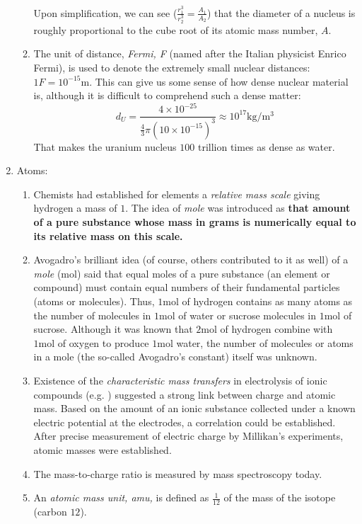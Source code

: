 \documentclass[12pt,a4paper]{book}
\begin{document}
\begin{enumerate}
\begin{enumerate}
                Upon simplification, we can see ($\frac{r_1^3}{r_2^3}=\frac{A_1}{A_2}$) that the diameter of a nucleus is roughly proportional to the cube root of its atomic mass number, $A$.
            \item \label{item: density-of-nucleus} The unit of distance, \emph{Fermi, F} (named after the Italian physicist Enrico Fermi), is used to denote the extremely small nuclear distances: $1 F = 10^{-15}\si{\m}$. This can give us some sense of how dense nuclear material is, although it is difficult to comprehend such a dense matter:
                $$
                    d_U = \frac{4\times 10^{-25}}{\frac{4}{3}\pi (10\times 10^{-15})^3} \approx 10^{17}\si{\kg\per\cubic\metre} 
                $$
                That makes the uranium nucleus $100$ trillion times as dense as water.
        \end{enumerate}
    \item Atoms:
        \begin{enumerate}
            \item Chemists had established for elements a \emph{relative mass scale} giving hydrogen a mass of $1$. The idea of \emph{mole} was introduced as \textbf{that amount of a pure substance whose mass in grams is numerically equal to its relative mass on this scale.}
            \item Avogadro's brilliant idea (of course, others contributed to it as well) of a \emph{mole} (\si{\mol}) said that equal moles of a pure substance (an element or compound) must contain equal numbers of their fundamental particles (atoms or molecules). Thus, $1\si{\mol}$ of hydrogen contains as many  atoms as the number of  molecules in $1\si{\mol}$ of water or sucrose molecules in $1\si{\mol}$ of sucrose. Although it was known that $2\si{\mol}$ of hydrogen combine with $1\si{\mol}$ of oxygen to produce $1\si{\mol}$ water, the number of molecules or atoms in a mole (the so-called Avogadro's constant) itself was unknown.
            \item Existence of the \emph{characteristic mass transfers} in electrolysis of ionic compounds (e.g. ) suggested a strong link between charge and atomic mass. Based on the amount of an ionic substance collected under a known electric potential at the electrodes, a correlation could be established. After precise measurement of electric charge by Millikan's experiments, atomic masses were established.
            \item The mass-to-charge ratio is measured by mass spectroscopy today.
            \item An \emph{atomic mass unit, amu,} is defined as $\frac{1}{12}$ of the mass of the isotope  (carbon $12$).


\end{enumerate}
\end{enumerate}
\end{document}
